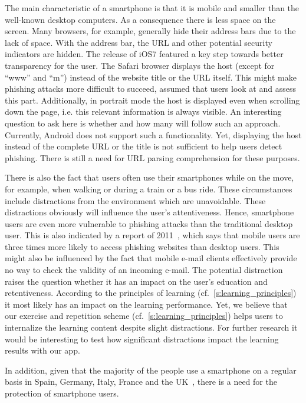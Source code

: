 \begin{description}[leftmargin=0cm]
	\item[Mobility and Size:] The main characteristic of a smartphone is that it is mobile and smaller than the well-known desktop computers.
 As a consequence there is less space on the screen.
 Many browsers, for example, generally hide their address bars due to the lack of space.
 With the address bar, the URL and other potential security indicators are hidden.
The release of iOS7 featured a key step towards better transparency for the user.
The Safari browser displays the host (except for ``www'' and ``m'') instead of the website title or the URL itself.
This might make phishing attacks more difficult to succeed, assumed that users look at and assess this part.
Additionally, in portrait mode the host is displayed even when scrolling down the page, i.e. this relevant information is always visible.
An interesting question to ask here is whether and how many will follow such an approach.
Currently, Android does not support such a functionality. 
Yet, displaying the host instead of the complete URL or the title is not sufficient to help users detect phishing.
There is still a need for URL parsing comprehension for these purposes.
	\item[Distraction Caused by Mobility:] There is also the fact that users often use their smartphones while on the move, for example, when walking or  during a train or a bus ride.
 These circumstances include distractions from the environment which are unavoidable.
 These distractions obviously will influence the user's attentiveness.
 Hence, smartphone users are even more vulnerable to phishing attacks than the traditional desktop user.
 This is also indicated by a report of 2011~\cite{trusteer2011}, which says that mobile users are three times more likely to access phishing websites than desktop users.
 This might also be influenced by the fact that mobile e-mail clients effectively provide no way to check the validity of an incoming e-mail.
The potential distraction raises the question whether it has an impact on the user's education and retentiveness.
According to the principles of learning (cf.~\autoref{s:learning_principles}) it most likely has an impact on the learning performance.
Yet, we believe that our exercise and repetition scheme (cf.~\autoref{s:learning_principles}) helps users to internalize the learning content despite slight distractions.
For further research it would be interesting to test how significant distractions impact the learning results with our app.
	\item[High Number of Smartphone Users:] In addition, given that the majority of the people use a smartphone on a regular basis in Spain, Germany, Italy, France and the UK~\cite{smartphoneusage}, there is a need for the protection of smartphone users.
\end{description} 

